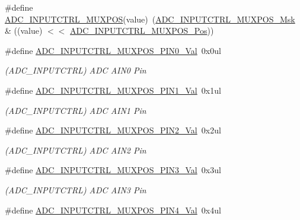 \begin{DoxyCompactItemize}
\item 
\#define \mbox{\hyperlink{group___s_a_m_d21___a_d_c_gac4fa999bded624468a8fe33fa727c831}{A\+D\+C\+\_\+\+I\+N\+P\+U\+T\+C\+T\+R\+L\+\_\+\+M\+U\+X\+P\+OS}}(value)~(\mbox{\hyperlink{group___s_a_m_d21___a_d_c_ga2a4879aff5af3c137d6e63102c94b804}{A\+D\+C\+\_\+\+I\+N\+P\+U\+T\+C\+T\+R\+L\+\_\+\+M\+U\+X\+P\+O\+S\+\_\+\+Msk}} \& ((value) $<$$<$ \mbox{\hyperlink{group___s_a_m_d21___a_d_c_ga583868be285e1c06c9a93dfd552d8c6a}{A\+D\+C\+\_\+\+I\+N\+P\+U\+T\+C\+T\+R\+L\+\_\+\+M\+U\+X\+P\+O\+S\+\_\+\+Pos}}))
\item 
\#define \mbox{\hyperlink{group___s_a_m_d21___a_d_c_gaea9cc7afd1e866fcdbe6801c16a38504}{A\+D\+C\+\_\+\+I\+N\+P\+U\+T\+C\+T\+R\+L\+\_\+\+M\+U\+X\+P\+O\+S\+\_\+\+P\+I\+N0\+\_\+\+Val}}~0x0ul
\begin{DoxyCompactList}\small\item\em (A\+D\+C\+\_\+\+I\+N\+P\+U\+T\+C\+T\+RL) A\+DC A\+I\+N0 Pin \end{DoxyCompactList}\item 
\#define \mbox{\hyperlink{group___s_a_m_d21___a_d_c_ga075966e1aeef57a83923f219a59df02d}{A\+D\+C\+\_\+\+I\+N\+P\+U\+T\+C\+T\+R\+L\+\_\+\+M\+U\+X\+P\+O\+S\+\_\+\+P\+I\+N1\+\_\+\+Val}}~0x1ul
\begin{DoxyCompactList}\small\item\em (A\+D\+C\+\_\+\+I\+N\+P\+U\+T\+C\+T\+RL) A\+DC A\+I\+N1 Pin \end{DoxyCompactList}\item 
\#define \mbox{\hyperlink{group___s_a_m_d21___a_d_c_ga52b8eaed2fc94e502a9f84e989c17ee8}{A\+D\+C\+\_\+\+I\+N\+P\+U\+T\+C\+T\+R\+L\+\_\+\+M\+U\+X\+P\+O\+S\+\_\+\+P\+I\+N2\+\_\+\+Val}}~0x2ul
\begin{DoxyCompactList}\small\item\em (A\+D\+C\+\_\+\+I\+N\+P\+U\+T\+C\+T\+RL) A\+DC A\+I\+N2 Pin \end{DoxyCompactList}\item 
\#define \mbox{\hyperlink{group___s_a_m_d21___a_d_c_gab3c2542ab94ed621d288448dea54595e}{A\+D\+C\+\_\+\+I\+N\+P\+U\+T\+C\+T\+R\+L\+\_\+\+M\+U\+X\+P\+O\+S\+\_\+\+P\+I\+N3\+\_\+\+Val}}~0x3ul
\begin{DoxyCompactList}\small\item\em (A\+D\+C\+\_\+\+I\+N\+P\+U\+T\+C\+T\+RL) A\+DC A\+I\+N3 Pin \end{DoxyCompactList}\item 
\#define \mbox{\hyperlink{group___s_a_m_d21___a_d_c_ga49f7bff2068e3d9c1eb782837f6bfbc1}{A\+D\+C\+\_\+\+I\+N\+P\+U\+T\+C\+T\+R\+L\+\_\+\+M\+U\+X\+P\+O\+S\+\_\+\+P\+I\+N4\+\_\+\+Val}}~0x4ul
$$
\end{DoxyCompactItemize}
